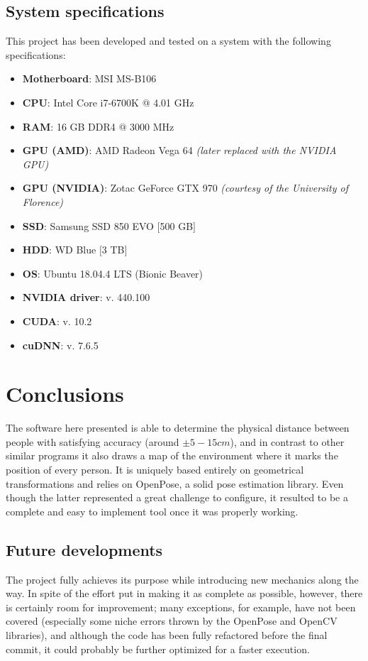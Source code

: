 \documentclass[12pt]{article}
\begin{document}

\subsection{System specifications}
\label{chap:specs}
This project has been developed and tested on a system with the following specifications:
\begin{itemize}
    \item \textbf{Motherboard}: MSI MS-B106
    \item \textbf{CPU}:  Intel Core i7-6700K @ 4.01 GHz
    \item \textbf{RAM}: 16 GB DDR4 @ 3000 MHz
    \item \textbf{GPU (AMD)}: AMD Radeon Vega 64 \textit{(later replaced with the NVIDIA GPU)}
    \item \textbf{GPU (NVIDIA)}: Zotac GeForce GTX 970 \textit{(courtesy of the University of Florence)}
    \item \textbf{SSD}: Samsung SSD 850 EVO $[$500 GB$]$
    \item \textbf{HDD}: WD Blue $[$3 TB$]$
    \item \textbf{OS}: Ubuntu 18.04.4 LTS (Bionic Beaver)
    \item \textbf{NVIDIA driver}: v. 440.100
    \item \textbf{CUDA}: v. 10.2
    \item \textbf{cuDNN}: v. 7.6.5
\end{itemize}


\section{Conclusions}
\label{chap:conclusions}
The software here presented is able to determine the physical distance between people with satisfying accuracy (around $\pm 5-15 cm$), and in contrast to other similar programs\cite{others} it also draws a map of the environment where it marks the position of every person. It is uniquely based entirely on geometrical transformations and relies on OpenPose, a solid pose estimation library. Even though the latter represented a great challenge to configure, it resulted to be a complete and easy to implement tool once it was properly working.


\subsection{Future developments}
\label{chap:future}
The project fully achieves its purpose while introducing new mechanics along the way. In spite of the effort put in making it as complete as possible, however, there is certainly room for improvement; many exceptions, for example, have not been covered (especially some niche errors thrown by the OpenPose and OpenCV libraries), and although the code has been fully refactored before the final commit, it could probably be further optimized for a faster execution.
\end{document}
